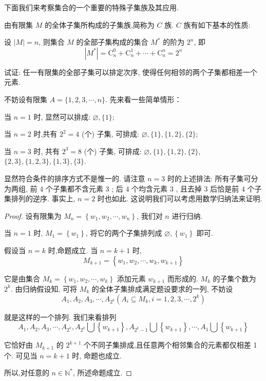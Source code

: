 下面我们来考察集合的一个重要的特殊子集族及其应用.

由有限集 $M$ 的全体子集所构成的子集族,简称为 $C$ 族. $C$ 族有如下基本的性质:

\begin{property}
	设 $|M|=n$, 则集合 $M$ 的全部子集构成的集合 $M^{*}$ 的阶为 $2^{n}$, 即
	$$
		\left|M^{*}\right|=\mathrm{C}_{n}^{0}+\mathrm{C}_{n}^{1}+\cdots+\mathrm{C}_{n}^{n}=2^{n}
	$$
\end{property}

\begin{example}\label{ex:任一有限集的全部子集}
	试证: 任一有限集的全部子集可以排定次序, 使得任何相邻的两个子集都相差一个元素.
\end{example}

\begin{analysis}
	不妨设有限集 $A=\{1,2,3, \cdots, n\}$. 先来看一些简单情形：

	当 $n=1$ 时, 显然可以排成: $\varnothing,\{1\} ;$

	当 $n=2$ 时,共有 $2^{2}=4$ (个) 子集, 可排成: $\varnothing,\{1\},\{1,2\},\{2\}$;

	当 $n=3$ 时, 共有 $2^{3}=8$ (个) 子集, 可排成: $\varnothing,\{1\},\{1,2\},\{2\}$, $\{2,3\},\{1,2,3\},\{1,3\},\{3\}$.

	显然符合条件的排序方式不是惟一的. 请注意 $n=3$ 时的上述排法: 所有子集可分为两组, 前 4 个子集都不含元素 3 ; 后 4 个均含元素 3 , 且去掉 3 后恰是前 4 个子集排列的逆序. 事实上, $n=2$ 时也如此. 这说明我们可以考虑用数学归纳法来证明.
\end{analysis}

\begin{proof}
	设有限集为 $M_{n}=\left\{w_{1}, w_{2}, \cdots, w_{n}\right\}$, 我们对 $n$ 进行归纳.

	当 $n=1$ 时, $M_{1}=\left\{w_{1}\right\}$, 将它的两个子集排列成 $\varnothing,\left\{w_{1}\right\}$ 即可.

	假设当 $n=k$ 时,命题成立. 当 $n=k+1$ 时,
	$$
		M_{k+1}=\left\{w_{1}, w_{2}, \cdots, w_{k}, w_{k+1}\right\}
	$$

	它是由集合 $M_{k}=\left\{w_{1}, w_{2}, \cdots, w_{k}\right\}$ 添加元素 $w_{k+1}$ 而形成的. $M_{k}$ 的子集个数为\\
	$2^{k}$. 由归纳假设知, 可将 $M_{k}$ 的全体子集排成满足题设要求的一列, 不妨设
	$$
		A_{1}, A_{2}, A_{3}, \cdots, A_{2^{k}}\left(A_{i} \subseteq M_{k}, i=1,2,3, \cdots, 2^{k}\right)
	$$

	就是这样的一个排列. 我们来看排列
	$$
		A_{1}, A_{2}, A_{3}, \cdots, A_{2^{k}}, A_{2^{k}} \bigcup\left\{w_{k+1}\right\}, A_{2^{k}-1} \bigcup\left\{w_{k+1}\right\}, \cdots, A_{1} \bigcup\left\{w_{k+1}\right\}
	$$

	它恰好由 $M_{k+1}$ 的 $2^{k+1}$ 个不同子集排成,且任意两个相邻集合的元素都仅相差 1 个. 可见当 $n=k+1$ 时, 命题也成立.

	所以,对任意的 $n \in \mathbb{N}^{*}$, 所述命题成立.
\end{proof}

